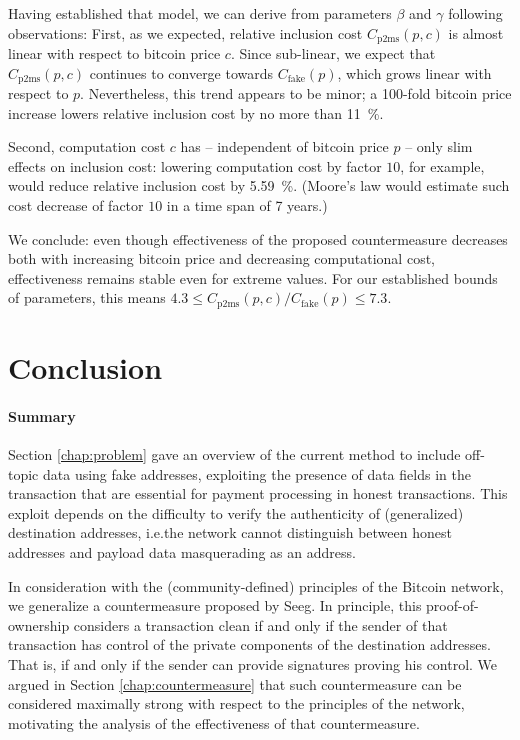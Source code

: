 \documentclass[a4paper,11pt,titlepage]{scrbook}
\begin{document}
Having established that model, we can derive from parameters $\beta$ and $\gamma$ following observations:
First, as we expected, relative inclusion cost $C_\mathrm{p2ms}(p,c)$ is almost linear with respect to bitcoin price $c$.
Since sub-linear, we expect that $C_\mathrm{p2ms}(p,c)$ continues to converge towards $C_\mathrm{fake}(p)$, which grows linear with respect to $p$.
Nevertheless, this trend appears to be minor; a 100-fold bitcoin price increase lowers relative inclusion cost by no more than \SI{11}{\percent}.

Second, computation cost $c$ has – independent of bitcoin price $p$ – only slim effects on inclusion cost: lowering computation cost by factor $10$, for example, would reduce relative inclusion cost by \SI{5.59}{\percent}. (Moore's law would estimate such cost decrease of factor $10$ in a time span of 7 years.)

We conclude: even though effectiveness of the proposed countermeasure decreases both with increasing bitcoin price and decreasing computational cost, effectiveness remains stable even for extreme values.
For our established bounds of parameters, this means $\num{4.3} \leq C_\mathrm{p2ms}(p,c) / C_\mathrm{fake}(p) \leq \num{7.3}$.


\chapter{Conclusion}\label{chap:conclusion}

\subsubsection*{Summary}

Section \ref{chap:problem} gave an overview of the current method to include off-topic data using fake addresses, exploiting the presence of data fields in the transaction that are essential for payment processing in honest transactions.
This exploit depends on the difficulty to verify the authenticity of (generalized) destination addresses, i.e.\@ the network cannot distinguish between honest addresses and payload data masquerading as an address.

In consideration with the (community-defined) principles of the Bitcoin network, we generalize a countermeasure proposed by Seeg.
In principle, this proof-of-ownership considers a transaction clean if and only if the sender of that transaction has control of the private components of the destination addresses.
That is, if and only if the sender can provide signatures proving his control.
We argued in Section \ref{chap:countermeasure} that such countermeasure can be considered maximally strong with respect to the principles of the network, motivating the analysis of the effectiveness of that countermeasure.
\end{document}

